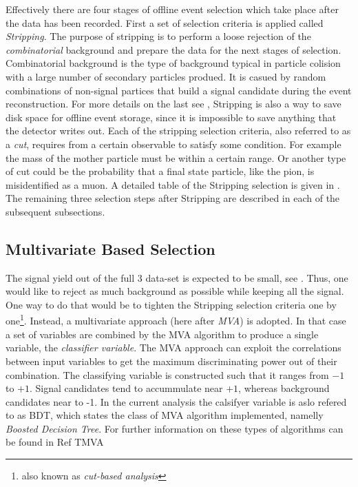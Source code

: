 
Effectively there are four stages of offline event selection which take place after the data has been recorded.
First a set of selection criteria is applied called {\it Stripping}. The purpose of stripping is to perform
a loose rejection of the {\it combinatorial} background and prepare the data for the next stages of selection.
Combinatorial background is the type of background typical in particle colision with a large number of secondary
particles produed. It is casued by random combinations of non-signal partices that build a signal candidate during
the event reconstruction. For more details on the last see ,
Stripping is also a way to save disk space for offline event storage, since it is impossible to save anything
that the detector writes out. Each of the stripping selection criteria, also referred to as a {\it cut},
requires from a certain observable to satisfy some condition. For example the mass of the mother particle \Bs must be within
a certain range. Or another type of cut could be the probability that a final state particle, like the pion, is misidentified
as a muon. A detailed table of the Stripping selection is given in . The remaining three selection
steps after Stripping are described in each of the subsequent subsections.

\subsection{Multivariate Based Selection}
\label{Multivariate_Based_Selection}

The \BsJpsiKst signal yield out of the full 3 \invfb data-set is expected to be small, see . Thus, one would like to
reject as much background as possible while keeping all the signal. One way to do that would be to tighten the Stripping selection criteria
one by one\footnote{also known as {\it cut-based analysis}}. Instead, a multivariate approach (here after {\it MVA}) is adopted.
In that case a set of variables are combined by the MVA algorithm to produce a single variable, the {\it classifier variable}.
The MVA approach can exploit the correlations between input variables to get the maximum discriminating power out of their combination.
The classifying variable is constructed such that it ranges from $-1$ to $+1$. Signal candidates tend to accummulate near $+1$,
whereas background candidates near to -1. In the current analysis the calsifyer variable is aslo refered to as BDT, which states
the class of MVA algorithm implemented, namelly {\it Boosted Decision Tree}. For further information on these types of algorithms
can be found in {\color{red}Ref TMVA }


